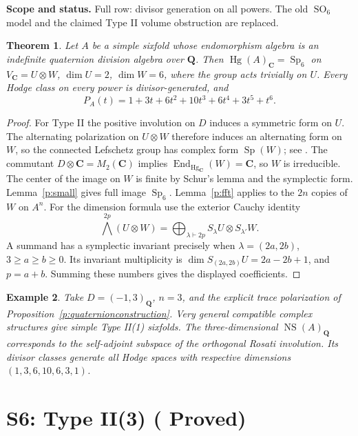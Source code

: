 \documentclass[11pt,reqno]{article}
\theoremstyle{emphasizedplain}
\DeclareRobustCommand{\provedstatus}{%
  \texorpdfstring{\textcolor{ProvedGreen}{\textbf{Proved}}}{Proved}}
\newtheorem{theorem}{Theorem}[section]
\theoremstyle{emphasizeddefinition}
\newtheorem{example}[theorem]{Example}
\theoremstyle{emphasizeddefinition}
\DeclareMathOperator{\End}{End}
\DeclareMathOperator{\Hg}{Hg}
\DeclareMathOperator{\Sp}{Sp}
\DeclareMathOperator{\SO}{SO}
\DeclareMathOperator{\NS}{NS}
\newcommand{\Q}{\mathbf Q}
\newcommand{\C}{\mathbf C}
\newcommand{\status}[1]{%
  \par\nobreak\smallskip\noindent
  {\setlength{\fboxsep}{7pt}%
   \colorbox{ScopeBackground}{%
    \parbox{\dimexpr\linewidth-2\fboxsep\relax}{%
     \small\textbf{\textcolor{HeadingInk}{Scope and status.}} #1}}}%
  \par\nobreak\medskip}
\begin{document}
\status{Full row: divisor generation on all powers. The old $\SO_6$
model and the claimed Type II volume obstruction are replaced.}
\begin{theorem}
Let $A$ be a simple sixfold whose endomorphism algebra is an indefinite
quaternion division algebra over $\Q$. Then $\Hg(A)_\C=\Sp_6$ on
$V_\C=U\otimes W$, $\dim U=2$, $\dim W=6$, where the group acts trivially
on $U$. Every Hodge class on every power is divisor-generated, and
\[
 P_A(t)=1+3t+6t^2+10t^3+6t^4+3t^5+t^6.
\]
\end{theorem}
\begin{proof}
For Type II the positive involution on $D$ induces a symmetric form on
$U$. The alternating polarization on $U\otimes W$ therefore induces an
alternating form on $W$, so the connected Lefschetz group has complex form
$\Sp(W)$; see \cite[\S3.2]{Vial}.
The commutant $D\otimes\C=M_2(\C)$ implies $\End_{\Hg_\C}(W)=\C$,
so $W$ is irreducible. The center of the image on $W$ is finite by
Schur's lemma and the symplectic form. Lemma~\ref{p:small} gives full image
$\Sp_6$. Lemma~\ref{p:fft} applies to the $2n$ copies of $W$ on $A^n$.
For the dimension formula use the exterior Cauchy identity
\[
 \bigwedge^{2p}(U\otimes W)
   =\bigoplus_{\lambda\vdash2p} S_\lambda U\otimes S_{\lambda'}W.
\]
A summand has a symplectic invariant precisely when
$\lambda=(2a,2b)$, $3\geq a\geq b\geq0$. Its invariant multiplicity is
$\dim S_{(2a,2b)}U=2a-2b+1$, and $p=a+b$.
Summing these numbers gives the displayed coefficients.
\end{proof}
\begin{example}
Take $D=(-1,3)_\Q$, $n=3$, and the explicit trace polarization of
Proposition~\ref{p:quaternionconstruction}. Very general compatible
complex structures give simple Type II(1) sixfolds. The three-dimensional
$\NS(A)_\Q$ corresponds to the self-adjoint subspace of the orthogonal
Rosati involution. Its divisor classes generate all Hodge spaces with
respective dimensions $(1,3,6,10,6,3,1)$.
\end{example}
\section{S6: Type II(3) (\provedstatus)}\label{sec:S6}
\end{document}
